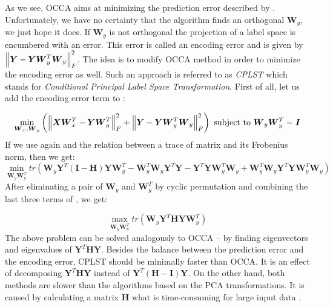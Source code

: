 \documentclass[english,a4paper,twoside]{ppfcmthesis}
\begin{document}
As we see, OCCA aims at minimizing the prediction error described by . Unfortunately, we have no certainty that the algorithm finds an orthogonal $\boldsymbol{W}_y$, we just hope it does. If $\boldsymbol{W}_y$ is not orthogonal the projection of a label space is encumbered with an error. This error is called an encoding error and is given by $\left\lVert\boldsymbol{Y}-\boldsymbol{Y}\boldsymbol{W}_y^T\boldsymbol{W}_y\right\rVert_{F}^2$. The idea is to modify OCCA method in order to minimize the encoding error as well. Such an approach is referred to as \textit{CPLST} \citep{ChenLin} which stands for \textit{Conditional Principal Label Space Transformation}. First of all, let us add the encoding error term to : 

\begin{equation}\label{eq:cplst5}
    \min_{\boldsymbol{W}_x, \boldsymbol{W}_y} \left(\left\lVert\boldsymbol{X}\boldsymbol{W}_x^T-\boldsymbol{Y}\boldsymbol{W}_y^T\right\rVert_{F}^2 + \left\lVert\boldsymbol{Y}-\boldsymbol{Y}\boldsymbol{W}_y^T\boldsymbol{W}_y\right\rVert_{F}^2\right)  
    \text{  subject to   } \boldsymbol{W}_y\boldsymbol{W}_y^T=\boldsymbol{I}   
\end{equation}
If we use again  and the relation between a trace of matrix and its Frobenius norm, then we get:
\begin{equation}\label{eq:cplst6}
    \min_{\boldsymbol{W}_y\boldsymbol{W}_y^T} tr(\boldsymbol{W}_y\boldsymbol{Y}^T(\boldsymbol{I}-\boldsymbol{H})\boldsymbol{Y}\boldsymbol{W}_y^T-\boldsymbol{W}_y^T\boldsymbol{W}_y\boldsymbol{Y}^T\boldsymbol{Y}-\boldsymbol{Y}^T\boldsymbol{Y}\boldsymbol{W}_y^T\boldsymbol{W}_y+\boldsymbol{W}_y^T\boldsymbol{W}_y\boldsymbol{Y}^T\boldsymbol{Y}\boldsymbol{W}_y^T\boldsymbol{W}_y)  
\end{equation}
After eliminating a pair of $\boldsymbol{W}_y$ and $\boldsymbol{W}_y^T$ by cyclic permutation and combining the last three terms of , we get:

\begin{equation}\label{eq:cplst6}
    \max_{\boldsymbol{W}_y\boldsymbol{W}_y^T} tr(\boldsymbol{W}_y\boldsymbol{Y}^T\boldsymbol{H}\boldsymbol{Y}\boldsymbol{W}_y^T)  
\end{equation}
The above problem can be solved analogously to OCCA -- by finding eigenvectors and eigenvalues of $\boldsymbol{Y}^T\boldsymbol{H}\boldsymbol{Y}$. Besides the balance between the prediction error and the encoding error, CPLST should be minimally faster than OCCA. It is an effect of decomposing $\boldsymbol{Y}^T\boldsymbol{H}\boldsymbol{Y}$ instead of $\boldsymbol{Y}^T(\boldsymbol{H}-\boldsymbol{I})\boldsymbol{Y}$. On the other hand, both methods are slower than the algorithms based on the PCA transformations. It is caused by calculating a matrix $\boldsymbol{H}$ what is time-consuming for large input data \citep{ChenLin}.
\end{document}
